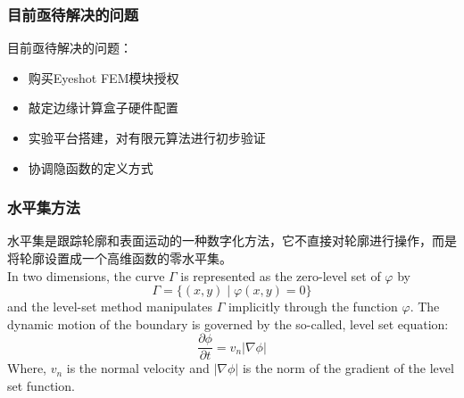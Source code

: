 \documentclass[lang=en,aspectratio=43,theme=default,logo=on]{simplebeamer}
\begin{document}
\begin{frame}[fragile]
    \frametitle{目前亟待解决的问题}
    目前亟待解决的问题：
        \begin{itemize}
        \item 购买Eyeshot FEM模块授权
        \item 敲定边缘计算盒子硬件配置
        \item 实验平台搭建，对有限元算法进行初步验证
        \item 协调隐函数的定义方式
    \end{itemize}
\end{frame}

\begin{frame}[fragile]
    \frametitle{水平集方法}
     水平集是跟踪轮廓和表面运动的一种数字化方法，它不直接对轮廓进行操作，而是将轮廓设置成一个高维函数的零水平集。\\
     In two dimensions, the curve $\displaystyle \Gamma$ is represented as the zero-level set of $\displaystyle \varphi$ by
     \begin{equation*}
         \displaystyle \Gamma =\{(x,y)\mid \varphi (x,y)=0\}
     \end{equation*}
     and the level-set method manipulates $\displaystyle \Gamma$ implicitly through the function $\displaystyle \varphi $. The dynamic motion of the boundary is governed by the so-called, level set equation:
     \begin{equation*}
         \frac{\partial \phi }{\partial t} = v_n | \nabla \phi |
     \end{equation*}
     Where, $v_n$ is the normal velocity and $|\nabla \phi|$ is the norm of the gradient of the level set function.
\end{frame}
\end{document}
